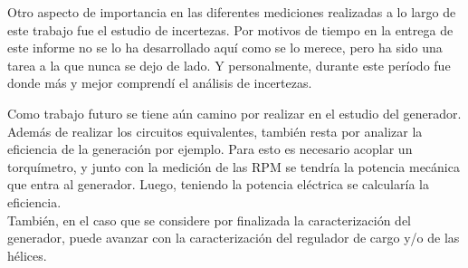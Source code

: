 \documentclass[a4paper,11pt,twoside]{IT-CNEA}
\begin{document}
\par Otro aspecto de importancia en las diferentes mediciones realizadas a lo largo de este trabajo fue el estudio de incertezas. Por motivos de tiempo en la entrega de este informe no se lo ha desarrollado aquí como se lo merece, pero ha sido una tarea a la que nunca se dejo de lado. Y personalmente, durante este período fue donde más y mejor comprendí el análisis de incertezas.
\par Como trabajo futuro se tiene aún camino por realizar en el estudio del generador. Además de realizar los circuitos equivalentes, también resta por analizar la eficiencia de la generación por ejemplo. Para esto es necesario acoplar un torquímetro, y junto con la medición de las RPM se tendría la potencia mecánica que entra al generador. Luego, teniendo la potencia eléctrica se calcularía la eficiencia. 
\\También, en el caso que se considere por finalizada la caracterización del generador, puede avanzar con la caracterización del regulador de cargo y/o de las hélices. 
\end{document}
